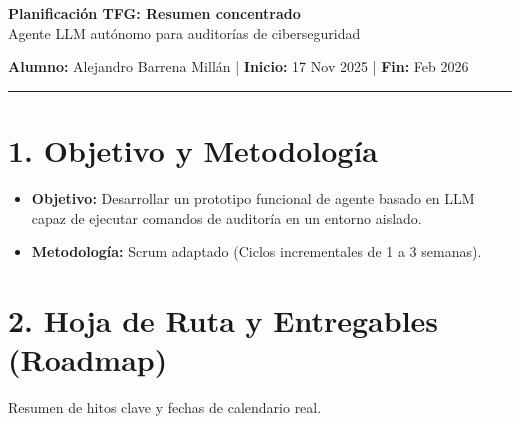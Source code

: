 \documentclass[11pt,a4paper]{article}
\begin{document}
\begin{center}
    {\Large \textbf{Planificación TFG: Resumen concentrado}}\\[5pt]
    {\large Agente LLM autónomo para auditorías de ciberseguridad}
    
    \vspace{0.5cm}
    \textbf{Alumno:} Alejandro Barrena Millán \quad | \quad \textbf{Inicio:} 17 Nov 2025 \quad | \quad \textbf{Fin:} Feb 2026
\end{center}

\hrule
\vspace{0.5cm}

\section*{1. Objetivo y Metodología}

\begin{itemize}
    \item \textbf{Objetivo:} Desarrollar un prototipo funcional de agente basado en LLM capaz de ejecutar comandos de auditoría en un entorno aislado.
    \item \textbf{Metodología:} Scrum adaptado (Ciclos incrementales de 1 a 3 semanas).
\end{itemize}

\section*{2. Hoja de Ruta y Entregables (Roadmap)}

Resumen de hitos clave y fechas de calendario real.
\end{document}
